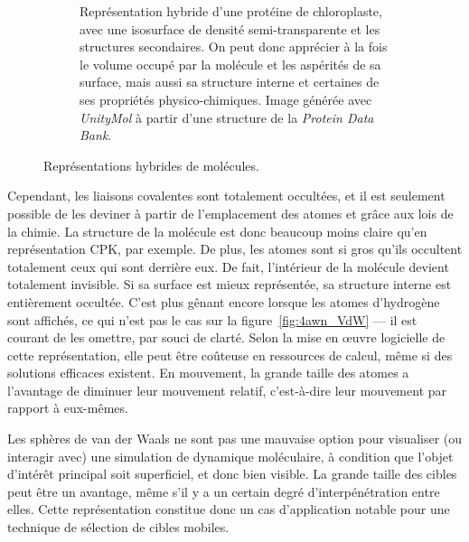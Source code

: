 \begin{appendices}
\begin{figure}[!htbp]
\begin{subfigure}[t]{0.58\textwidth}
			\caption[Surface semi-transparente et structures secondaires]{Représentation hybride d'une protéine de chloroplaste, avec une isosurface de densité semi-transparente et les structures secondaires. On peut donc apprécier à la fois le volume occupé par la molécule et les aspérités de sa surface, mais aussi sa structure interne et certaines de ses propriétés physico-chimiques. Image générée avec \emph{UnityMol} à partir d'une structure de la \emph{Protein Data Bank}.}
			\label{fig:transSS}
		\end{subfigure}
		\label{fig:hybrid}
		\caption{Représentations hybrides de molécules.}
	\end{figure}
		
	Cependant, les liaisons covalentes sont totalement occultées, et il est seulement possible de les \og deviner \fg{} à partir de l'emplacement des atomes et grâce aux lois de la chimie. La structure de la molécule est donc beaucoup moins claire qu'en représentation CPK, par exemple. De plus, les atomes sont si gros qu'ils occultent totalement ceux qui sont derrière eux. De fait, l'intérieur de la molécule devient totalement invisible. Si sa surface est mieux représentée, sa structure interne est entièrement occultée. C'est plus gênant encore lorsque les atomes d'hydrogène sont affichés, ce qui n'est pas le cas sur la figure~\ref{fig:4awn_VdW} --- il est courant de les omettre, par souci de clarté. Selon la mise en \oe{}uvre logicielle de cette représentation, elle peut être coûteuse en ressources de calcul, même si des solutions efficaces existent. En mouvement, la grande taille des atomes a l'avantage de diminuer leur mouvement relatif, c'est-à-dire leur mouvement par rapport à eux-mêmes.
		
	Les sphères de van der Waals ne sont pas une mauvaise option pour visualiser (ou interagir avec) une simulation de dynamique moléculaire, à condition que l'objet d'intérêt principal soit superficiel, et donc bien visible. La grande taille des cibles peut être un avantage, même s'il y a un certain degré d'interpénétration entre elles. Cette représentation constitue donc un cas d'application notable pour une technique de sélection de cibles mobiles.
	

\end{appendices}
